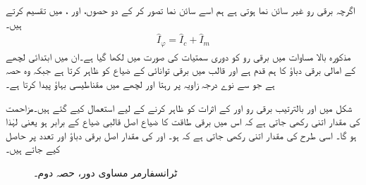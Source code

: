  اگرچہ برقی رو  غیر سائن نما ہوتی ہے ہم  اسے سائن نما   تصور  کر کے  دو حصوں،  اور ، میں تقسیم کرتے ہیں۔
\begin{align}\label{مساوات_ٹرانسفارمر_رو_ہیجان_ضیاع_اجزاع}
\hat{I}_\varphi=\hat{I}_c+\hat{I}_m
\end{align}
مذکورہ بالا مساوات میں برقی رو کو دوری سمتیات کی صورت میں لکھا گیا ہے۔ان میں   ابتدائی لچھے کے امالی برقی دباؤ  کا ہم قدم ہے اور  قالب میں برقی توانائی کے ضیاع کو ظاہر کرتا ہے جبکہ   وہ حصہ ہے جو  سے نوے درجہ   زاویہ  پر رہتا اور  لچھے میں مقناطیسی بہاؤ پیدا کرتا ہے۔

شکل  میں   اور   بالترتیب برقی رو  اور  کے اثرات کو ظاہر کرنے کے لیے استعمال کیے گئے ہیں۔مزاحمت  کی مقدار اتنی رکھی جاتی ہے کہ اس میں برقی طاقت کا ضیاع اصل قالبی ضیاع کے برابر ہو یعنی  لہٰذا   ہو گا۔ اسی طرح  کی مقدار اتنی رکھی جاتی ہے کہ  ہو۔  اور   کی مقدار اصل برقی دباؤ اور تعدد پر حاصل کیے جاتے ہیں۔ 

\begin{figure}
\centering
\caption{ٹرانسفارمر مساوی دور، حصہ دوم۔}
\label{شکل_ٹرانسفارمر_ماڈل_حصہ_دوم}
\end{figure}

